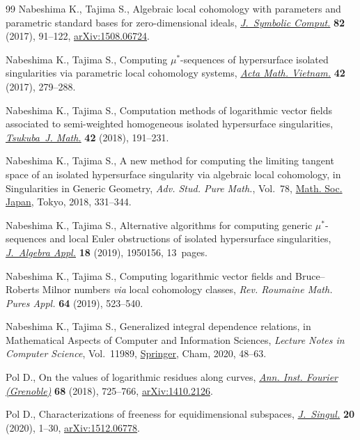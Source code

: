 \begin{thebibliography}{99}
Nabeshima K., Tajima S., Algebraic local cohomology with parameters and
 parametric standard bases for zero-dimensional ideals, \href{https://doi.org/10.1016/j.jsc.2017.01.003}{\textit{J.~Symbolic
 Comput.}} \textbf{82} (2017), 91--122, \href{https://arxiv.org/abs/1508.06724}{arXiv:1508.06724}.

Nabeshima K., Tajima S., Computing {$\mu^*$}-sequences of hypersurface isolated
 singularities via parametric local cohomology systems, \href{https://doi.org/10.1007/s40306-016-0198-4}{\textit{Acta Math.
 Vietnam.}} \textbf{42} (2017), 279--288.

Nabeshima K., Tajima S., Computation methods of logarithmic vector fields
 associated to semi-weighted homogeneous isolated hypersurface singularities,
 \href{https://doi.org/10.21099/tkbjm/1554170422}{\textit{Tsukuba~J. Math.}} \textbf{42} (2018), 191--231.

Nabeshima K., Tajima S., A new method for computing the limiting tangent space
 of an isolated hypersurface singularity via algebraic local cohomology, in
 Singularities in Generic Geometry, \textit{Adv. Stud. Pure Math.}, Vol.~78,
 \href{https://doi.org/10.2969/aspm/07810331}{Math. Soc. Japan}, Tokyo, 2018, 331--344.

Nabeshima K., Tajima S., Alternative algorithms for computing generic
 {$\mu^*$}-sequences and local {E}uler obstructions of isolated hypersurface
 singularities, \href{https://doi.org/10.1142/S0219498819501561}{\textit{J.~Algebra Appl.}} \textbf{18} (2019), 1950156,
 13~pages.

Nabeshima K., Tajima S., Computing logarithmic vector fields and
 {B}ruce--{R}oberts {M}ilnor numbers {\it via} local cohomology classes,
 \textit{Rev. Roumaine Math. Pures Appl.} \textbf{64} (2019), 523--540.

Nabeshima K., Tajima S., Generalized integral dependence relations, in
 Mathematical Aspects of Computer and Information Sciences, \textit{Lecture
 Notes in Computer Science}, Vol.~11989, \href{https://doi.org/10.1007/978-3-030-43120-4_6}{Springer}, Cham, 2020, 48--63.

Pol D., On the values of logarithmic residues along curves, \href{https://doi.org/10.5802/aif.3176}{\textit{Ann. Inst.
 Fourier (Grenoble)}} \textbf{68} (2018), 725--766, \href{https://arxiv.org/abs/1410.2126}{arXiv:1410.2126}.

Pol D., Characterizations of freeness for equidimensional subspaces,
 \href{https://doi.org/10.5427/jsing.2020.20a}{\textit{J.~Singul.}} \textbf{20} (2020), 1--30, \href{https://arxiv.org/abs/1512.06778}{arXiv:1512.06778}.


\end{thebibliography}
